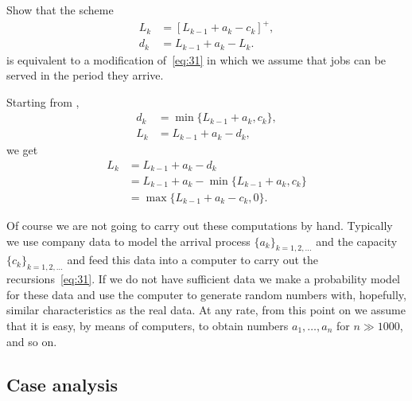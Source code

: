 \begin{exercise}\label{ex:24}
  Show that the scheme
\begin{equation}\label{eq:5}
  \begin{split}
  L_k &= [L_{k-1}+a_k - c_k]^+,\\
  d_k &= L_{k-1} +a_k- L_{k}.
  \end{split}
\end{equation}
is equivalent to a modification of~\cref{eq:31} in which we assume that jobs can be served in the period they arrive.
\begin{solution}
Starting from ,
  \begin{align*}
    d_k &= \min\{L_{k-1}+a_k, c_k\}, \\
    L_k &= L_{k-1} + a_k - d_k,
  \end{align*}
  we get
  \begin{align*}
    L_k &= L_{k-1} + a_k - d_k \\ 
        &= L_{k-1} + a_k - \min\{L_{k-1}+a_k, c_k\} \\
        &= \max\{L_{k-1} + a_k - c_k, 0 \}.
  \end{align*}
\end{solution}
\end{exercise}



Of course we are not going to carry out these computations by hand.
Typically we use company data to model the arrival process $\{a_k\}_{k=1,2,\ldots}$ and the capacity $\{c_k\}_{k=1,2,\ldots}$ and feed this data into a computer to carry out the recursions~\cref{eq:31}.
If we do not have sufficient data we make a probability model for these data and use the computer to generate random numbers with, hopefully, similar characteristics as the real data.
At any rate, from this point on we assume that it is easy, by means of computers, to obtain numbers $a_1,\ldots, a_n$ for $n\gg 1000$, and so on.


\subsection*{Case analysis}
\label{sec:case-analysis}

